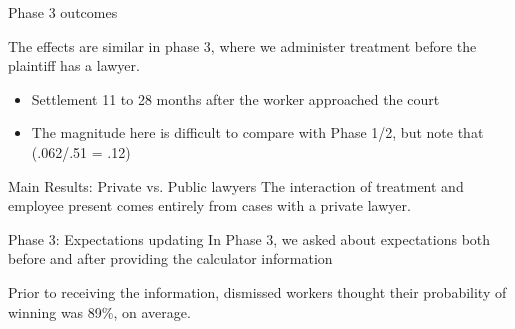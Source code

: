 \documentclass[9pt]{beamer}
\begin{document}
 \begin{frame}{Phase 3 outcomes}

    \label{frame_Main_Resultse}
    The effects are similar in phase 3, where we administer treatment before the plaintiff has a lawyer.
    \begin{itemize}
        \item Settlement 11 to 28 months after the worker approached the court
        \item The magnitude here is difficult to compare with Phase 1/2, but note that (.062/.51 = .12)
    \end{itemize}
    \hyperlink{frame_Table3D}{}
 \end{frame}
 
 \begin{frame}{Main Results: Private vs. Public lawyers}
 The interaction of treatment and employee present comes entirely from cases with a private lawyer.  
     \begin{table}[H]
    \caption{Treatment Effects conditional on type of lawyer}
    \label{te_bylawyer}
    \begin{center}
     \scriptsize{}
    \end{center}
\end{table}
 \vspace{.2in} 
 \end{frame}
 
 \begin{frame}{Phase 3: Expectations updating}
 In Phase 3, we asked about expectations both before and after providing the calculator information
     \begin{table}[H]
    \label{calc_template}
    \begin{center}
        \scriptsize{}
        \end{center}
\end{table}
Prior to receiving the information, dismissed workers thought their probability of winning was 89\%, on average.
 \end{frame}
 
 
\end{document}
